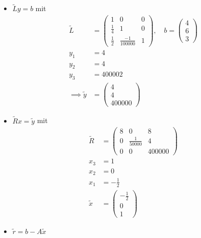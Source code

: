 \documentclass[12pt]{scrartcl}
\begin{document}
\begin{enumAlph}
\begin{itemize}
    
    \item[II.] $\tilde{L}y = b$ mit 
        \[
        \begin{aligned}
        \tilde{L} &= \begin{pmatrix}
            1 & 0 & 0 \\
            \frac{1}{4} & 1 & 0 \\
            \frac{1}{2} & \frac{-1}{100 000} & 1
        \end{pmatrix}, \quad
        b = \begin{pmatrix}
            4 \\ 6 \\ 3 
        \end{pmatrix}
        \\
        y_1 &= 4 \\
        y_2 &= 4 \\
        y_3 &= 400002\\[6pt]
        \implies \tilde{y}&=\begin{pmatrix}
            4 \\ 4 \\ 400000
        \end{pmatrix}
        \end{aligned}
        \]

    \item[III.] $\tilde{R}x=\tilde{y}$ mit
        \[
        \begin{aligned}
        \tilde{R} &= \begin{pmatrix}
           8 & 0 & 8 \\
            0 & \frac{1}{50000} & 4 \\
            0 & 0 & 400000
        \end{pmatrix}
        \\[6pt]
        x_3 &= 1\\
        x_2 &= 0\\
        x_1 &= -\frac{1}{2}\\[6pt]
        \tilde{x} &=\begin{pmatrix}
            -\frac{1}{2} \\ 0 \\ 1
        \end{pmatrix}
        \end{aligned}
        \]

    \item[IV.] $\tilde{r}=b-A\tilde{x}$


\end{itemize}
\end{enumAlph}
\end{document}
